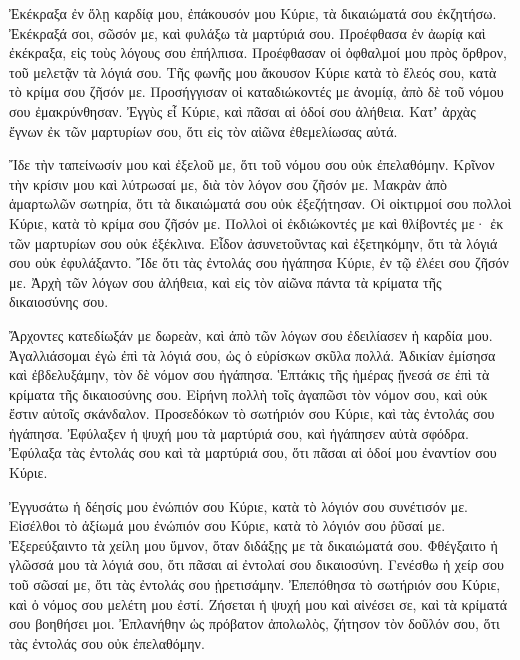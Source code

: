 \begin{spacing}{1.1}
\begin{multicols}{2}
Ἐκέκραξα ἐν ὅλῃ καρδίᾳ μου, ἐπάκουσόν μου Κύριε, τὰ δικαιώματά σου ἐκζητήσω.
Ἐκέκραξά σοι, σῶσόν με, καὶ φυλάξω τὰ μαρτύριά σου.
Προέφθασα ἐν ἀωρίᾳ καὶ ἐκέκραξα, εἰς τοὺς λόγους σου ἐπήλπισα.
Προέφθασαν οἱ ὀφθαλμοί μου πρὸς ὄρθρον, τοῦ μελετᾷν τὰ λόγιά σου.
Τῆς φωνῆς μου ἄκουσον Κύριε κατὰ τὸ ἔλεός σου, κατὰ τὸ κρίμα σου ζῆσόν με.
Προσήγγισαν οἱ καταδιώκοντές με ἀνομίᾳ, ἀπὸ δὲ τοῦ νόμου σου ἐμακρύνθησαν.
Ἐγγὺς εἶ Κύριε, καὶ πᾶσαι αἱ ὁδοί σου ἀλήθεια.
Κατʼ ἀρχὰς ἔγνων ἐκ τῶν μαρτυρίων σου, ὅτι εἰς τὸν αἰῶνα ἐθεμελίωσας αὐτά.

Ἴδε τὴν ταπείνωσίν μου καὶ ἐξελοῦ με, ὅτι τοῦ νόμου σου οὐκ ἐπελαθόμην.
Κρῖνον τὴν κρίσιν μου καὶ λύτρωσαί με, διὰ τὸν λόγον σου ζῆσόν με.
Μακρὰν ἀπὸ ἁμαρτωλῶν σωτηρία, ὅτι τὰ δικαιώματά σου οὐκ ἐξεζήτησαν.
Οἱ οἰκτιρμοί σου πολλοὶ Κύριε, κατὰ τὸ κρίμα σου ζῆσόν με.
Πολλοὶ οἱ ἐκδιώκοντές με καὶ θλίβοντές με· ἐκ τῶν μαρτυρίων σου οὐκ ἐξέκλινα.
Εἶδον ἀσυνετοῦντας καὶ ἐξετηκόμην, ὅτι τὰ λόγιά σου οὐκ ἐφυλάξαντο.
Ἴδε ὅτι τὰς ἐντολάς σου ἠγάπησα Κύριε, ἐν τῷ ἐλέει σου ζῆσόν με.
Ἀρχὴ τῶν λόγων σου ἀλήθεια, καὶ εἰς τὸν αἰῶνα πάντα τὰ κρίματα τῆς δικαιοσύνης σου.

Ἄρχοντες κατεδίωξάν με δωρεὰν, καὶ ἀπὸ τῶν λόγων σου ἐδειλίασεν ἡ καρδία μου.
Ἀγαλλιάσομαι ἐγὼ ἐπὶ τὰ λόγιά σου, ὡς ὁ εὑρίσκων σκῦλα πολλά.
Ἀδικίαν ἐμίσησα καὶ ἐβδελυξάμην, τὸν δὲ νόμον σου ἠγάπησα.
Ἑπτάκις τῆς ἡμέρας ᾔνεσά σε ἐπὶ τὰ κρίματα τῆς δικαιοσύνης σου.
Εἰρήνη πολλὴ τοῖς ἀγαπῶσι τὸν νόμον σου, καὶ οὐκ ἔστιν αὐτοῖς σκάνδαλον.
Προσεδόκων τὸ σωτήριόν σου Κύριε, καὶ τὰς ἐντολάς σου ἠγάπησα.
Ἐφύλαξεν ἡ ψυχή μου τὰ μαρτύριά σου, καὶ ἠγάπησεν αὐτὰ σφόδρα.
Ἐφύλαξα τὰς ἐντολάς σου καὶ τὰ μαρτύριά σου, ὅτι πᾶσαι αἱ ὁδοί μου ἐναντίον σου Κύριε.

Ἐγγυσάτω ἡ δέησίς μου ἐνώπιόν σου Κύριε, κατὰ τὸ λόγιόν σου συνέτισόν με.
Εἰσέλθοι τὸ ἀξίωμά μου ἐνώπιόν σου Κύριε, κατὰ τὸ λόγιόν σου ῥῦσαί με.
Ἐξερεύξαιντο τὰ χείλη μου ὕμνον, ὅταν διδάξῃς με τὰ δικαιώματά σου.
Φθέγξαιτο ἡ γλῶσσά μου τὰ λόγιά σου, ὅτι πᾶσαι αἱ ἐντολαί σου δικαιοσύνη.
Γενέσθω ἡ χείρ σου τοῦ σῶσαί με, ὅτι τὰς ἐντολάς σου ᾑρετισάμην.
Ἐπεπόθησα τὸ σωτήριόν σου Κύριε, καὶ ὁ νόμος σου μελέτη μου ἐστί.
Ζήσεται ἡ ψυχή μου καὶ αἰνέσει σε, καὶ τὰ κρίματά σου βοηθήσει μοι.
Ἐπλανήθην ὡς πρόβατον ἀπολωλὸς, ζήτησον τὸν δοῦλόν σου, ὅτι τὰς ἐντολάς σου οὐκ ἐπελαθόμην.


\end{multicols}
\end{spacing}
